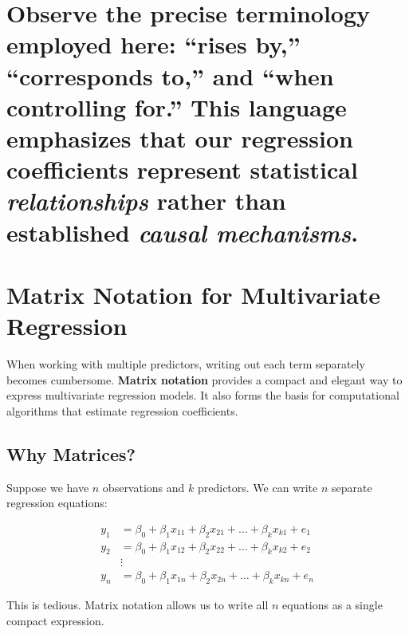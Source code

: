 \documentclass[
  letterpaper,
  DIV=11,
  numbers=noendperiod]{scrreprt}
\begin{document}
\section{\texorpdfstring{Observe the precise terminology employed here:
``rises by,'' ``corresponds to,'' and ``when controlling for.'' This
language emphasizes that our regression coefficients represent
statistical \emph{relationships} rather than established \emph{causal
mechanisms}.}{Observe the precise terminology employed here: ``rises by,'' ``corresponds to,'' and ``when controlling for.'' This language emphasizes that our regression coefficients represent statistical relationships rather than established causal mechanisms.}}\label{observe-the-precise-terminology-employed-here-rises-by-corresponds-to-and-when-controlling-for.-this-language-emphasizes-that-our-regression-coefficients-represent-statistical-relationships-rather-than-established-causal-mechanisms.}

\section{Matrix Notation for Multivariate
Regression}\label{matrix-notation-for-multivariate-regression}

When working with multiple predictors, writing out each term separately
becomes cumbersome. \textbf{Matrix notation} provides a compact and
elegant way to express multivariate regression models. It also forms the
basis for computational algorithms that estimate regression
coefficients.

\subsection{Why Matrices?}\label{why-matrices}

Suppose we have \(n\) observations and \(k\) predictors. We can write
\(n\) separate regression equations:

\[
\begin{aligned}
y_1 &= \beta_0 + \beta_1 x_{11} + \beta_2 x_{21} + \ldots + \beta_k x_{k1} + e_1 \\
y_2 &= \beta_0 + \beta_1 x_{12} + \beta_2 x_{22} + \ldots + \beta_k x_{k2} + e_2 \\
&\vdots \\
y_n &= \beta_0 + \beta_1 x_{1n} + \beta_2 x_{2n} + \ldots + \beta_k x_{kn} + e_n
\end{aligned}
\]

This is tedious. Matrix notation allows us to write all \(n\) equations
as a single compact expression.
\end{document}
